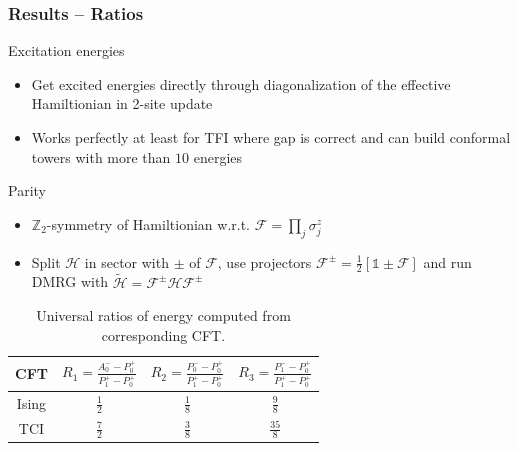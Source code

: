 \documentclass[10pt]{beamer}
\begin{document}
\begin{frame}
    \frametitle{Results -- Ratios}

    \begin{block}{Excitation energies}
        \begin{itemize}
            \item Get excited energies directly through diagonalization of the effective Hamiltionian in 2-site update
            \pause
            \item Works perfectly at least for TFI where gap is correct and can build conformal towers with more than $10$ energies
        \end{itemize}
    \end{block}

    \pause
    \begin{block}{Parity}
        \begin{itemize}
            \item $\mathbb{Z}_2$-symmetry of Hamiltionian w.r.t. $\mathcal{F} = \prod_j \sigma^z_j$
            \pause
            \item Split $\mathcal{H}$ in sector with $\pm$ of $\mathcal{F}$, use projectors $\mathcal{F}^\pm = \frac{1}{2}[\mathbb{1} \pm \mathcal{F}]$ and run DMRG with $\tilde{\mathcal{H}} = \mathcal{F}^\pm \mathcal{H}\mathcal{F}^\pm $
        \end{itemize}
    \end{block}

    \pause
    \begin{table}
        \centering
        \renewcommand{\arraystretch}{1.3}
        \begin{tabular}{c|ccc}
            CFT & $R_1 = \frac{A^-_0 - P^+_0}{P^+_1 - P^+_0}$ & $R_2 = \frac{P^-_0 - P^+_0}{P^+_1 - P^+_0}$ & $R_3 = \frac{P^-_1 - P^+_0}{P^+_1 - P^+_0}$ \\
            \hline
            Ising & $\frac{1}{2}$ & $\frac{1}{8}$ & $\frac{9}{8}$ \\
            TCI & $\frac{7}{2}$ & $\frac{3}{8}$ & $\frac{35}{8}$
        \end{tabular}
        \caption{Universal ratios of energy computed from corresponding CFT.}
    \end{table}
\end{frame}
\end{document}
